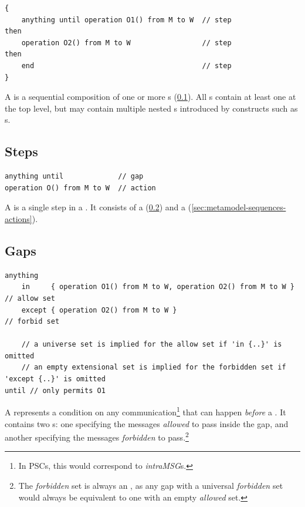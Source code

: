 \begin{lstlisting}[style=Example]
{
	anything until operation O1() from M to W  // step
then
	operation O2() from M to W                 // step
then
	end                                        // step
}
\end{lstlisting}

A \msubsequence{} is a sequential composition of one or more \msequencestep s
(\cref{ssec:metamodel-sequences-steps}).
All \msequence s contain at least one \msubsequence{} at the top level, but
may contain multiple nested \msubsequence s introduced by constructs such as
\mloopaction s.

\subsection{Steps}\label{ssec:metamodel-sequences-steps}

\begin{lstlisting}[style=Example]
anything until             // gap
operation O() from M to W  // action
\end{lstlisting}

A \msequencestep{} is a single step in a \msubsequence.  It consists of a
\msequencegap{} (\cref{ssec:metamodel-sequences-gaps}) and a
\msequenceaction{} (\cref{sec:metamodel-sequences-actions}).

\subsection{Gaps}\label{ssec:metamodel-sequences-gaps}

\begin{lstlisting}[style=Example]
anything
	in     { operation O1() from M to W, operation O2() from M to W }  // allow set
	except { operation O2() from M to W }                              // forbid set

	// a universe set is implied for the allow set if 'in {..}' is omitted
	// an empty extensional set is implied for the forbidden set if 'except {..}' is omitted
until // only permits O1
\end{lstlisting}

A \msequencegap{} represents a condition on any communication\footnote{In PSCs,
this would correspond to \emph{intraMSG}s.} that can happen
\emph{before} a \msequenceaction.  
It contains two \mgapmessageset s: one specifying the messages
\emph{allowed} to pass inside the gap, and another specifying the messages
\emph{forbidden} to pass.\footnote{The \emph{forbidden} set is always an
\mextensionalgapmessageset, as any gap with a universal
\emph{forbidden} set would always be equivalent to one with an empty
\emph{allowed} set.
}


